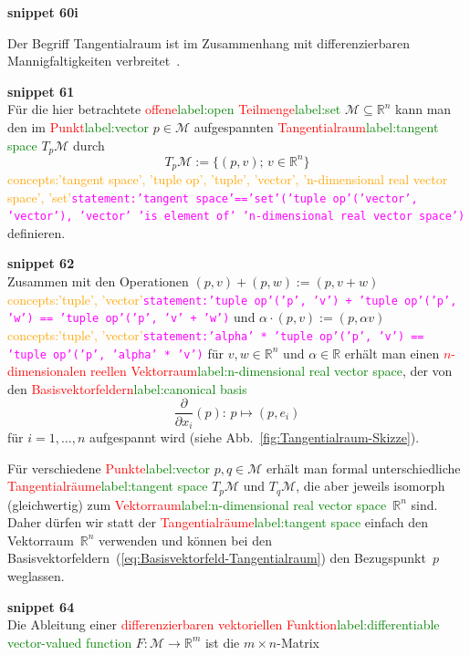 \documentclass[a4paper,twoside,english,ngerman,deutsch,german,sectrefs,envcountsame,envcountchap]{svmono}
\newcommand{\setref}[2]{\textcolor{red}{#1}\textcolor{green}{#2}}
\newcommand{\snippet}[1]{\textbf{snippet #1}\\}
\newcommand{\eqnote}[2]{\textcolor{orange}{#1}\textcolor{magenta}{\texttt{#2}}}
\begin{document}
\snippet{60i}
\begin{remark}
[Tangentialraum]\label{rem:tangentialraum}Der Begriff Tangentialraum ist im Zusammenhang mit differenzierbaren Mannigfaltigkeiten verbreitet~\cite{abraham1983,jaenich2005,lee2006}.

\snippet{61}
Für die hier betrachtete \setref{offene}{label:open} \setref{Teilmenge}{label:set} $\mathcal{M}\subseteq{\mathbb{R}}^{n}$ kann man den im \setref{Punkt}{label:vector} $p\in\mathcal{M}$ aufgespannten \setref{Tangentialraum}{label:tangent space} $T_{p}\mathcal{M}$ durch
\[
T_{p}\mathcal{M}:=\{(p,v);\,v\in{\mathbb{R}}^{n}\}
\]\eqnote{concepts:'tangent space', 'tuple op', 'tuple', 'vector', 'n-dimensional real vector space', 'set'}{statement:'tangent space'=='set'('tuple op'('vector', 'vector'), 'vector' 'is element of' 'n-dimensional real vector space')}
definieren.

\snippet{62}
Zusammen mit den Operationen $(p,v)+(p,w):=(p,v+w)$\eqnote{concepts:'tuple', 'vector'}{statement:'tuple op'('p', 'v') + 'tuple op'('p', 'w') == 'tuple op'('p', 'v' + 'w')} und $\alpha\cdot(p,v):=(p,\alpha v)$\eqnote{concepts:'tuple', 'vector'}{statement:'alpha' * 'tuple op'('p', 'v') == 'tuple op'('p', 'alpha' * 'v')} für $v,w\in{\mathbb{R}}^{n}$ und $\alpha\in{\mathbb{R}}$ erhält man einen \setref{$n$-dimensionalen reellen Vektorraum}{label:n-dimensional real vector space}, der von den
\setref{Basisvektorfeldern}{label:canonical basis}
\begin{equation}
\frac{\partial}{\partial x_{i}}(p):\,p\mapsto(p,e_{i})\label{eq:Basisvektorfeld-Tangentialraum}
\end{equation}
für $i=1,\ldots,n$ aufgespannt wird (siehe Abb.~\ref{fig:Tangentialraum-Skizze}).

Für verschiedene \setref{Punkte}{label:vector} $p,q\in\mathcal{M}$ erhält man formal unterschiedliche \setref{Tangentialräume}{label:tangent space} $T_{p}\mathcal{M}$ und $T_{q}\mathcal{M}$, die aber jeweils isomorph (gleichwertig) zum \setref{Vektorraum}{label:n-dimensional real vector space}~${\mathbb{R}}^{n}$ sind. Daher dürfen wir statt der \setref{Tangentialräume}{label:tangent space} einfach den Vektor\-raum~$\mathbb{R}^{n}$ verwenden und können bei den Basisvektorfeldern~(\eqref{eq:Basisvektorfeld-Tangentialraum}) den Bezugspunkt~$p$ weglassen.
\end{remark}


\snippet{64}

Die Ableitung einer \setref{differenzierbaren vektoriellen Funktion}{label:differentiable vector-valued function} $F:\mathcal{M}\to{\mathbb{R}}^{m}$ ist die $m\times n$-Matrix
\end{document}
